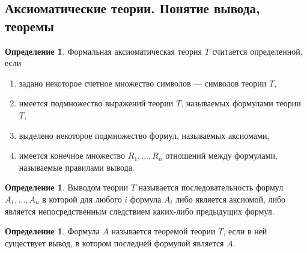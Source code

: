 \documentclass[12pt]{report}
\theoremstyle{definition}
\newtheorem{definition}[theorem]{Определение}
\begin{document}
\subsection{Аксиоматические теории. Понятие вывода, теоремы}

\begin{definition}
Формальная аксиоматическая теория $T$ считается определенной, если
\begin{enumerate}
\item задано некоторое счетное множество символов --- символов теории $T$,
\item имеется подмножество выражений теории $T$, называемых формулами теории $T$,
\item выделено некоторое подмножество формул, называемых аксиомами,
\item имеется конечное множество $R_1, \dots, R_n$ отношений между формулами,
  называемые правилами вывода.
\end{enumerate}
\end{definition}

\begin{definition}
Выводом теории $T$ называется последовательность формул $A_1, \dots, A_n$
в которой для любого $i$ формула $A_i$ либо является аксиомой, либо является
непосредственным следствием каких-либо предыдущих формул.
\end{definition}

\begin{definition}
Формула $A$ называется теоремой теории $T$, если в ней существует вывод,
в котором последней формулой является $A$.
\end{definition}
\end{document}
